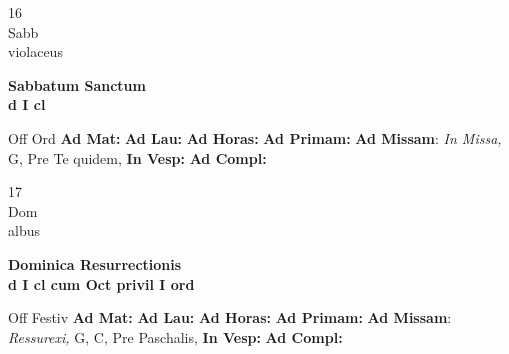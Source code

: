 \documentclass[10pt, openany]{book}
\begin{document}
    \begin{center}
        \begin{minipage}{3.5in}
            \vspace{2em}
            \begin{minipage}{0.5in}
                {\Huge 16} \\
                {\normalsize Sabb} \\
                {\normalsize violaceus}
            \end{minipage}
            \begin{minipage}{3.0in}
                \textbf{ \large Sabbatum Sanctum \\
                \textnormal{\normalsize d I cl}} \\ 
            \end{minipage}
            \begin{justify}Off Ord
                \textbf{Ad Mat: }
                \textbf{Ad Lau: }
                \textbf{Ad Horas: }
                \textbf{Ad Primam: }\textbf{Ad Missam}: \textit{In Missa,} G, Pre Te quidem,  
                \textbf{In Vesp: }
                \textbf{Ad Compl: }
            \end{justify}
        \end{minipage}
    \end{center}

    \begin{center}
        \begin{minipage}{3.5in}
            \vspace{2em}
            \begin{minipage}{0.5in}
                {\Huge 17} \\
                {\normalsize Dom} \\
                {\normalsize albus}
            \end{minipage}
            \begin{minipage}{3.0in}
                \textbf{ \large Dominica Resurrectionis \\
                \textnormal{\normalsize d I cl cum Oct privil I ord}} \\ 
            \end{minipage}
            \begin{justify}Off Festiv
                \textbf{Ad Mat: }
                \textbf{Ad Lau: }
                \textbf{Ad Horas: }
                \textbf{Ad Primam: }\textbf{Ad Missam}: \textit{Ressurexi,} G, C, Pre Paschalis,  
                \textbf{In Vesp: }
                \textbf{Ad Compl: }
            \end{justify}
        \end{minipage}
    \end{center}
\end{document}
